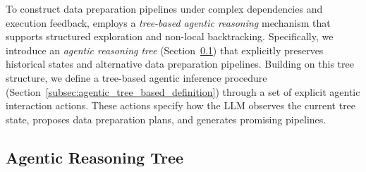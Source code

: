 To construct data preparation pipelines under complex dependencies and execution feedback, \sys employs a \emph{tree-based agentic reasoning} mechanism that supports structured exploration and non-local backtracking.
Specifically, we introduce an \emph{agentic reasoning tree} (Section~\ref{subsec:global_reasoning_tree}) that explicitly preserves historical states and alternative data preparation pipelines.
Building on this tree structure, we define a tree-based agentic inference procedure (Section~\ref{subsec:agentic_tree_based_definition}) through a set of explicit agentic interaction actions. These actions specify how the LLM observes the current tree state, proposes data preparation plans, and generates promising pipelines.

    
\subsection{Agentic Reasoning Tree}
\label{subsec:global_reasoning_tree}

